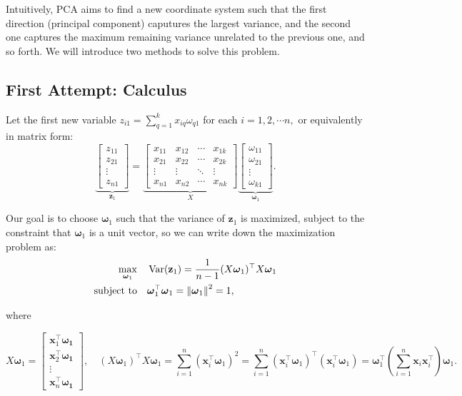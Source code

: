 \documentclass[12pt]{article}
\begin{document}
Intuitively, PCA aims to find a new coordinate system such that the first direction (principal component) caputures the largest variance, and the second one captures the maximum remaining variance unrelated to the previous one, and so forth.
We will introduce two methods to solve this problem.


\subsection{First Attempt: Calculus}

Let the first new variable $z_{i1} = \displaystyle\sum_{q=1}^{k}x_{iq}\omega_{q1}$ for each $i=1,2,\cdots n,$ or equivalently in matrix form:
\[
\underbrace{\begin{bmatrix}
z_{11} \\
z_{21} \\
\vdots \\
z_{n1}
\end{bmatrix}}_{\mathbf{z}_1}
=
\underbrace{\begin{bmatrix}
x_{11} & x_{12} & \cdots & x_{1k} \\
x_{21} & x_{22} & \cdots & x_{2k} \\
\vdots & \vdots & \ddots & \vdots \\
x_{n1} & x_{n2} & \cdots & x_{nk}
\end{bmatrix}}_{X}
\underbrace{\begin{bmatrix}
\omega_{11} \\
\omega_{21} \\
\vdots \\
\omega_{k1}
\end{bmatrix}}_{\boldsymbol{\omega}_1}.
\]

Our goal is to choose $\boldsymbol{\omega}_1$ such that the variance of $\mathbf{z}_1$ is maximized, subject to the constraint that $\boldsymbol{\omega}_1$ is a unit vector, so we can write down the maximization problem as:
\begin{equation}
\begin{split}
\max_{ \boldsymbol{\omega}_1} \quad &  \operatorname{Var}(\mathbf{z}_1) = \frac{1}{n-1}  (X \boldsymbol{\omega}_1)^\top X \boldsymbol{\omega}_1 \\
\text{subject to} \quad & \boldsymbol{\omega}_1^\top \boldsymbol{\omega}_1 = \left\|\boldsymbol{\omega}_1\right\|^2 = 1,
\end{split}
\end{equation}

where 

\[
 X \boldsymbol{\omega}_1 = \begin{bmatrix}
\mathbf{x}_1^\top \boldsymbol{{\omega}_1}\\
\mathbf{x}_2^\top \boldsymbol{{\omega}_1}\\
\vdots \\
\mathbf{x}_n^\top \boldsymbol{{\omega}_1}
\end{bmatrix}, \quad
(X \boldsymbol{\omega}_1)^\top X \boldsymbol{\omega}_1 = \sum_{i=1}^{n} (\mathbf{x}_i^\top \boldsymbol{\omega}_1)^2 = \sum_{i=1}^{n}(\mathbf{x}_i^\top \boldsymbol{\omega}_1)^\top (\mathbf{x}_i^\top \boldsymbol{\omega}_1) = 
\boldsymbol{\omega}_1^\top \left(\sum_{i=1}^{n} \mathbf{x}_i \mathbf{x}_i^\top \right) \boldsymbol{\omega}_1.
\]
\end{document}

